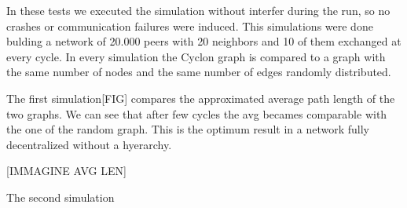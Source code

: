 \documentclass[a4paper,12pt,notitlepage]{article} %
\begin{document}
In these tests we executed the simulation without interfer during the run, so no crashes or 
 communication failures were induced. This simulations were done bulding a network of 20.000 
 peers with 20 neighbors and 10 of them exchanged at every cycle. In every simulation the Cyclon
 graph is compared to a graph with the same number of nodes and the same number of edges randomly distributed.

The first simulation[FIG] compares the approximated average path length of the two graphs. We can 
 see that after few cycles the avg becames comparable with the one of the random graph. This is the 
 optimum result in a network fully decentralized without a hyerarchy.

 [IMMAGINE AVG LEN]


The second simulation 
\end{document}
